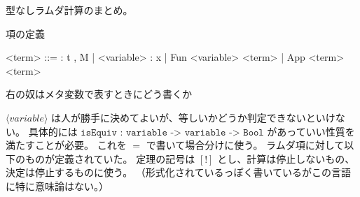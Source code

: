 \documentclass[dvipdfmx]{jsarticle}
\begin{document}
型なしラムダ計算のまとめ。

\begin{itembox}[l]{項の定義}
  \begin{bnfgrammar}
    <term> ::= : t , M
    | <variable> : x
    | Fun <variable> <term>
    | App <term> <term>
  \end{bnfgrammar}
  右の奴はメタ変数で表すときにどう書くか
\end{itembox}

\(\langle variable \rangle\) は人が勝手に決めてよいが、等しいかどうか判定できないといけない。
具体的には \(\texttt{isEquiv}\) : \(\texttt{variable -> variable -> Bool}\) があっていい性質を満たすことが必要。
これを \(=\) で書いて場合分けに使う。
ラムダ項に対して以下のものが定義されていた。
定理の記号は \([!]\) とし、計算は停止しないもの、決定は停止するものに使う。
（形式化されているっぽく書いているがこの言語に特に意味論はない。）
\end{document}
